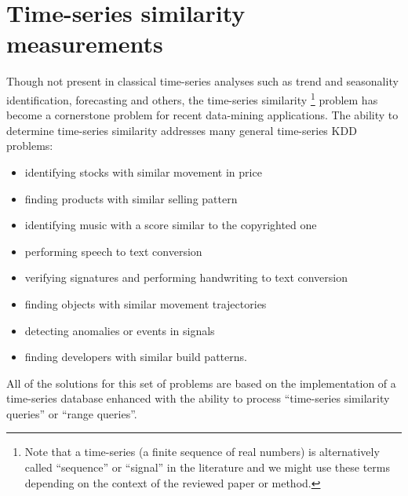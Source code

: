 \chapter{Time-series similarity measurements}
Though not present in classical time-series analyses such as trend and seasonality identification, forecasting and others, the time-series similarity \footnote{Note that a time-series (a finite sequence of real numbers) is alternatively called ``sequence'' or ``signal'' in the literature and we might use these terms depending on the context of the reviewed paper or method.}  problem has become a cornerstone problem for recent data-mining applications. The ability to determine time-series similarity addresses many general time-series KDD problems:
\begin{itemize}
	\item identifying stocks with similar movement in price \cite{citeulike:4384535} \cite{citeulike:4031865} \cite{citeulike:4025073}
	\item finding products with similar selling pattern \cite{citeulike:4326324}
	\item identifying music with a score similar to the copyrighted one \cite{citeulike:3821484} \cite{citeulike:3815076}
	\item performing speech to text conversion \cite{citeulike:3728228}
	\item verifying signatures and performing handwriting to text conversion \cite{citeulike:3733947} \cite{citeulike:3513035}
	\item finding objects with similar movement trajectories \cite{citeulike:964832} \cite{citeulike:3728229} \cite{citeulike:3815864}
	\item detecting anomalies or events in signals \cite{citeulike:4412621} \cite{citeulike:4412617}
	\item finding developers with similar build patterns.
\end{itemize}

All of the solutions for this set of problems are based on the implementation of a time-series database enhanced with the ability to process ``time-series similarity queries'' or ``range queries''. 

